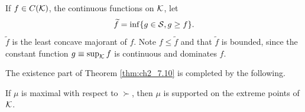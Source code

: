 
If $f \in C(\mathcal{K})$, the continuous functions on $\mathcal{K}$, let
\begin{equation}\label{eq:ch2_7.5}
    \widetilde{f} = \inf\{g \in \mathcal{S}, g \geq f\}.
\end{equation}
$\widetilde{f}$ is the least concave majorant of $f$. Note $f \leq \widetilde{f}$ and that $\widetilde{f}$ is bounded, since the constant function $g \equiv \sup_{\mathcal{K}} f$ is continuous and dominates $f$.

The existence part of Theorem \ref{thm:ch2_7.10} is completed by the following.

\begin{proposition}\label{prop:ch2_7.16}
If $\mu$ is maximal with respect to $\succ$, then $\mu$ is supported on the extreme points of $\mathcal{K}$.
\end{proposition}

